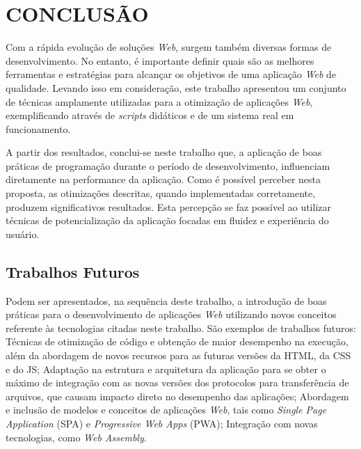 \chapter{CONCLUSÃO}
\label{Conclusao}

Com a rápida evolução de soluções \textit{Web}, surgem também diversas formas de desenvolvimento. No entanto, é importante definir quais são as melhores ferramentas e estratégias para alcançar os objetivos de uma aplicação \textit{Web} de qualidade. Levando isso em consideração, este trabalho apresentou um conjunto de técnicas amplamente utilizadas para a otimização de aplicações \textit{Web}, exemplificando através de \textit{scripts} didáticos e de um sistema real em funcionamento.

A partir dos resultados, conclui-se neste trabalho que, a aplicação de boas práticas de programação durante o período de desenvolvimento, influenciam diretamente na performance da aplicação. Como é possível perceber nesta proposta, as otimizações descritas, quando implementadas corretamente, produzem significativos resultados. Esta percepção se faz possível ao utilizar técnicas de potencialização da aplicação focadas em fluidez e experiência do usuário.

\section{Trabalhos Futuros}
\label{TrabalhosFuturos}

Podem ser apresentados, na sequência deste trabalho, a introdução de boas práticas para o desenvolvimento de aplicações \textit{Web} utilizando novos conceitos referente às tecnologias citadas neste trabalho. São exemplos de trabalhos futuros: Técnicas de otimização de código e obtenção de maior desempenho na execução, além da abordagem de novos recursos para as futuras versões da HTML, da CSS e do JS; Adaptação na estrutura e arquitetura da aplicação para se obter o máximo de integração com as novas versões dos protocolos para transferência de arquivos, que causam impacto direto no desempenho das aplicações; Abordagem e inclusão de modelos e conceitos de aplicações \textit{Web}, tais como \textit{Single Page Application} (SPA) e \textit{Progressive Web Apps} (PWA); Integração com novas tecnologias, como \textit{Web Assembly}.
